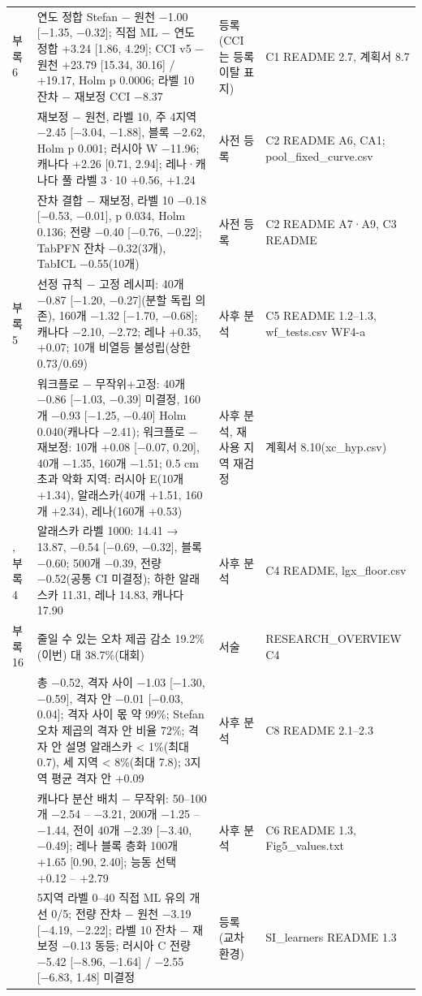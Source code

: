 {\begin{longtable}{@{}>{\raggedright\arraybackslash}p{1.2cm}>{\raggedright\arraybackslash}p{5.7cm}>{\raggedright\arraybackslash}p{2.9cm}>{\raggedright\arraybackslash}p{5.0cm}@{}}
부록 6 & 연도 정합 Stefan − 원천 −1.00 [−1.35, −0.32]; 직접 ML − 연도 정합 +3.24 [1.86, 4.29]; CCI v5 − 원천 +23.79 [15.34, 30.16] / +19.17, Holm p 0.0006; 라벨 10 잔차 − 재보정 CCI −8.37 & 등록(CCI 는 등록 이탈 표지) & C1 README 2.7, 계획서 8.7 \\
26 & 재보정 − 원천, 라벨 10, 주 4지역 −2.45 [−3.04, −1.88], 블록 −2.62, Holm p 0.001; 러시아 W −11.96; 캐나다 +2.26 [0.71, 2.94]; 레나·캐나다 풀 라벨 3·10 +0.56, +1.24 & 사전 등록 & C2 README A6, CA1; pool\_fixed\_curve.csv \\
27 & 잔차 결합 − 재보정, 라벨 10 −0.18 [−0.53, −0.01], p 0.034, Holm 0.136; 전량 −0.40 [−0.76, −0.22]; TabPFN 잔차 −0.32(3개), TabICL −0.55(10개) & 사전 등록 & C2 README A7·A9, C3 README \\
부록 5 & 선정 규칙 − 고정 레시피: 40개 −0.87 [−1.20, −0.27](분할 독립 의존), 160개 −1.32 [−1.70, −0.68]; 캐나다 −2.10, −2.72; 레나 +0.35, +0.07; 10개 비열등 불성립(상한 0.73/0.69) & 사후 분석 & C5 README 1.2–1.3, wf\_tests.csv WF4-a \\
30 & 워크플로 − 무작위+고정: 40개 −0.86 [−1.03, −0.39] 미결정, 160개 −0.93 [−1.25, −0.40] Holm 0.040(캐나다 −2.41); 워크플로 − 재보정: 10개 +0.08 [−0.07, 0.20], 40개 −1.35, 160개 −1.51; 0.5 cm 초과 악화 지역: 러시아 E(10개 +1.34), 알래스카(40개 +1.51, 160개 +2.34), 레나(160개 +0.53) & 사후 분석, 재사용 지역 재검정 & 계획서 8.10(xc\_hyp.csv) \\
17, 부록 4 & 알래스카 라벨 1000: 14.41 → 13.87, −0.54 [−0.69, −0.32], 블록 −0.60; 500개 −0.39, 전량 −0.52(공통 CI 미결정); 하한 알래스카 11.31, 레나 14.83, 캐나다 17.90 & 사후 분석 & C4 README, lgx\_floor.csv \\
부록 16 & 줄일 수 있는 오차 제곱 감소 19.2\%(이번) 대 38.7\%(대회) & 서술 & RESEARCH\_OVERVIEW C4 \\
22 & 총 −0.52, 격자 사이 −1.03 [−1.30, −0.59], 격자 안 −0.01 [−0.03, 0.04]; 격자 사이 몫 약 99\%; Stefan 오차 제곱의 격자 안 비율 72\%; 격자 안 설명 알래스카 < 1\%(최대 0.7), 세 지역 < 8\%(최대 7.8); 3지역 평균 격자 안 +0.09 & 사후 분석 & C8 README 2.1–2.3 \\
31 & 캐나다 분산 배치 − 무작위: 50–100개 −2.54 – −3.21, 200개 −1.25 – −1.44, 전이 40개 −2.39 [−3.40, −0.49]; 레나 블록 층화 100개 +1.65 [0.90, 2.40]; 능동 선택 +0.12 – +2.79 & 사후 분석 & C6 README 1.3, Fig5\_values.txt \\
32 & 5지역 라벨 0–40 직접 ML 유의 개선 0/5; 전량 잔차 − 원천 −3.19 [−4.19, −2.22]; 라벨 10 잔차 − 재보정 −0.13 동등; 러시아 C 전량 −5.42 [−8.96, −1.64] / −2.55 [−6.83, 1.48] 미결정 & 등록(교차 환경) & SI\_learners README 1.3 \\

\end{longtable}}
